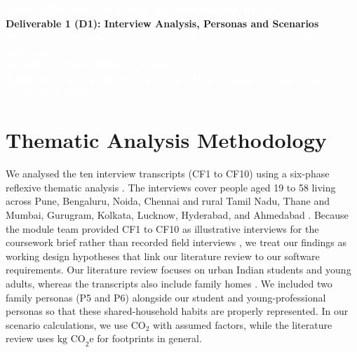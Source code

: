 \documentclass[12pt, a4paper]{article}
\begin{document}
\begin{tcolorbox}[enhanced, colback=cNavy, colframe=cNavy, arc=3pt, left=8pt, right=8pt, top=7pt, bottom=7pt]
\begin{center}
    {\bfseries\textcolor{white}{COMP2300: Software Design and Development Project}}\\[0.2em]
    {\bfseries\textcolor{bgSand}{Deliverable 1 (D1): Interview Analysis, Personas and Scenarios}}\\[0.15em]
    {\itshape\textcolor{white}{Topic 1: Carbon Footprint Awareness and Reduction Tool: India-Centric Challenge}}\\[0.35em]
    {\textcolor{white}{\textbf{Version:} 1.7 \quad|\quad \textbf{Date:} October 23, 2026}}\\[0.2em]
    {\textcolor{white}{\textbf{Authors:} Arnav (am31g25@soton.ac.uk), Hiranya (hm8g25@soton.ac.uk), Keshav (ks3e25@soton.ac.uk)}}
\end{center}
\end{tcolorbox}

\section{Thematic Analysis Methodology}
We analysed the ten interview transcripts (CF1 to CF10) \cite{cf1, cf2, cf3, cf4, cf5, cf6, cf7, cf8, cf9, cf10} using a six-phase reflexive thematic analysis . The interviews cover people aged 19 to 58 living across Pune, Bengaluru, Noida, Chennai and rural Tamil Nadu, Thane and Mumbai, Gurugram, Kolkata, Lucknow, Hyderabad, and Ahmedabad \cite{cf1, cf2, cf3, cf4, cf5, cf6, cf7, cf8, cf9, cf10}. Because the module team provided CF1 to CF10 as illustrative interviews for the coursework brief rather than recorded field interviews \cite{cf1, cf10} , we treat our findings as working design hypotheses that link our literature review to our software requirements. Our literature review focuses on urban Indian students and young adults, whereas the transcripts also include family homes \cite{cf3, cf6, cf8}. We included two family personas (P5 and P6) alongside our student and young-professional personas so that these shared-household habits are properly represented. In our scenario calculations, we use $\text{CO}_2$ with assumed factors, while the literature review uses $\text{kg CO}_2\text{e}$ for footprints in general.
\end{document}
